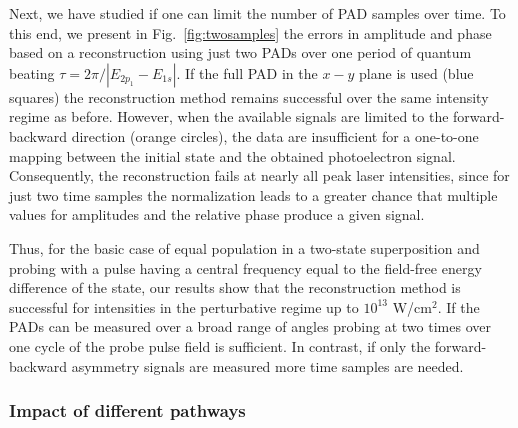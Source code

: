 Next, we have studied if one can limit the number of PAD samples over time. To this end, we present in Fig.\ \ref{fig:twosamples} the errors in amplitude and phase based on a reconstruction using just two PADs over one period of quantum beating $\tau = 2\pi / |E_{2p_1}-E_{1s}|$. If the full PAD in the $x-y$ plane is used (blue squares) the reconstruction method remains successful over the same intensity regime as before. However, when the available signals are limited to the forward-backward direction (orange circles), the data are insufficient for a one-to-one mapping between the initial state and the obtained photoelectron signal. Consequently, the reconstruction fails at nearly all peak laser intensities, since for just two time samples the normalization leads to a greater chance that multiple values for amplitudes and the relative phase produce a given signal.

Thus, for the basic case of equal population in a two-state superposition and probing with a pulse having a central frequency equal to the field-free energy difference of the state, our results show that the reconstruction method is successful for intensities in the perturbative regime up to $10^{13}$ W/cm$^2$. If the PADs can be measured over a broad range of angles probing at two times over one cycle of the probe pulse field is sufficient. In contrast, if only the forward-backward asymmetry signals are measured more time samples are needed.


\subsubsection{Impact of different pathways}

